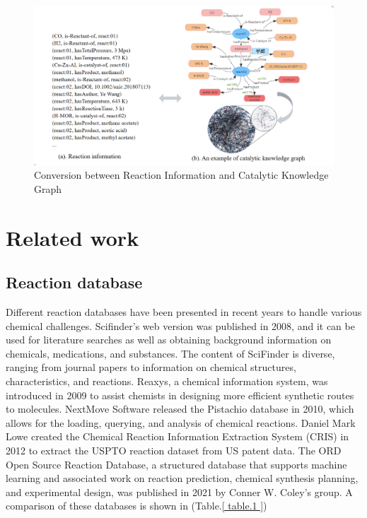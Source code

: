 \documentclass[%
 aip,
 jmp,%
 amsmath,amssymb,
 reprint,%
]{revtex4-2}
\begin{document}
\begin{figure}[htbp]
 \centering
 \includegraphics[width=1\textwidth]{figure/4.png}
 \caption{ Conversion between Reaction Information and Catalytic Knowledge Graph }
 \label{ Fig.4 }
\end{figure} 

\section{Related work}

\subsection{Reaction database}

Different reaction databases have been presented in recent years to handle various chemical challenges. Scifinder's web version was published in 2008\cite{gabrielson2018scifinder}, and it can be used for literature searches as well as obtaining background information on chemicals, medications, and substances. The content of SciFinder is diverse, ranging from journal papers to information on chemical structures, characteristics, and reactions.  Reaxys, a chemical information system, was introduced in 2009 to assist chemists in designing more efficient synthetic routes to molecules\cite{Reaxys}. NextMove Software released the Pistachio database in 2010\cite{pistachio}, which allows for the loading, querying, and analysis of chemical reactions. Daniel Mark Lowe created the Chemical Reaction Information Extraction System (CRIS) in 2012 to extract the USPTO reaction dataset from US patent data\cite{lowe2012extraction}. The ORD Open Source Reaction Database, a structured database that supports machine learning and associated work on reaction prediction, chemical synthesis planning, and experimental design, was published in 2021 by Conner W. Coley's group\cite{kearnes2021open}. A comparison of these databases is shown in (Table.\ref{ table.1 })
\end{document}
